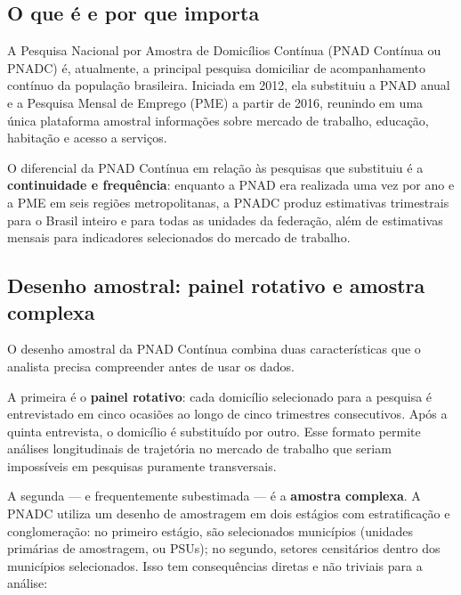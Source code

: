 \subsection{O que é e por que importa}

A Pesquisa Nacional por Amostra de Domicílios Contínua (PNAD Contínua ou PNADC) é, atualmente, a principal pesquisa domiciliar de acompanhamento contínuo da população brasileira. Iniciada em 2012, ela substituiu a PNAD anual e a Pesquisa Mensal de Emprego (PME) a partir de 2016, reunindo em uma única plataforma amostral informações sobre mercado de trabalho, educação, habitação e acesso a serviços.

O diferencial da PNAD Contínua em relação às pesquisas que substituiu é a \textbf{continuidade e frequência}: enquanto a PNAD era realizada uma vez por ano e a PME em seis regiões metropolitanas, a PNADC produz estimativas trimestrais para o Brasil inteiro e para todas as unidades da federação, além de estimativas mensais para indicadores selecionados do mercado de trabalho.

\subsection{Desenho amostral: painel rotativo e amostra complexa}

O desenho amostral da PNAD Contínua combina duas características que o analista precisa compreender antes de usar os dados.

A primeira é o \textbf{painel rotativo}: cada domicílio selecionado para a pesquisa é entrevistado em cinco ocasiões ao longo de cinco trimestres consecutivos. Após a quinta entrevista, o domicílio é substituído por outro. Esse formato permite análises longitudinais de trajetória no mercado de trabalho que seriam impossíveis em pesquisas puramente transversais.

A segunda --- e frequentemente subestimada --- é a \textbf{amostra complexa}. A PNADC utiliza um desenho de amostragem em dois estágios com estratificação e conglomeração: no primeiro estágio, são selecionados municípios (unidades primárias de amostragem, ou PSUs); no segundo, setores censitários dentro dos municípios selecionados. Isso tem consequências diretas e não triviais para a análise:

